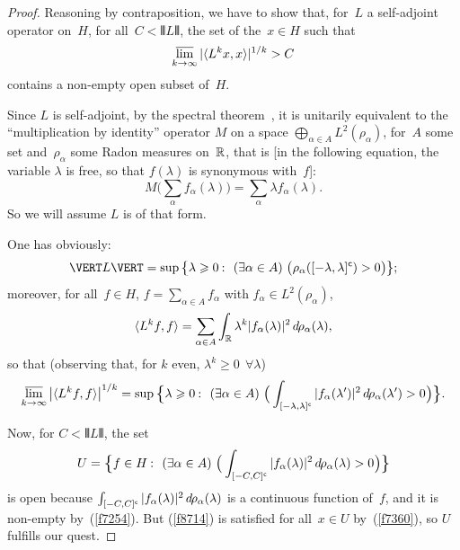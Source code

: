 \begin{proof}
Reasoning by contraposition, we have to show that,
for~$L$ a self-adjoint operator on~$H$, for all~$C < \VERT L \VERT$,
the set of the~$x \in H$ such that
\[ \label{f8714} \varlimsup_{k\to\infty} |\langle L^k x, x \rangle|^{1/k} > C \]
contains a non-empty open subset of~$H$.

Since $L$ is self-adjoint, by the spectral theorem~\cite[Theorem~7.18]{Weidmann},
it is unitarily equivalent to the ``multiplication by identity'' operator $M$
on a space $\bigoplus_{\alpha\in A} L^2(\rho_\alpha)$,
for~$A$ some set and~$\rho_\alpha$ some Radon measures on~$\mathbb{R}$, that is
[in the following equation, the variable $\lambda$ is free, so that
$f(\lambda)$ is synonymous with~$f$]:
\[ M\Big( \sum_\alpha f_\alpha(\lambda) \Big) = \sum_\alpha \lambda f_\alpha(\lambda) .\]
So we will assume $L$ is of that form.

One has obviously:
\[\label{f7254} \VERT L \VERT = \sup \big\{ \lambda \geq 0 \colon 
(\exists \alpha \in A) \ \big(\rho_\alpha(\C{[-\lambda,\lambda]}) > 0\big) \big\} ;\]
moreover, for all~$f \in H$,
$f = \sum_{\alpha\in A} f_\alpha$ with $f_\alpha \in L^2(\rho_\alpha)$,
\[ \langle L^k f, f \rangle =
\sum_{\alpha\in A} \int_{\RR} \lambda^k |f_\alpha(\lambda)|^2 \,\dx\rho_\alpha(\lambda) ,\]
so that (observing that, for $k$ even, $\lambda^k \geq 0\ \ \forall\lambda$)
\[\label{f7360}
\limsup_{k\longto\infty} \big|\langle L^k f, f \rangle\big|^{1/k}
= \sup \Big\{\lambda \geq 0 \colon (\exists \alpha \in A) \ 
\Big(\int_{\C{[-\lambda,\lambda]}} |f_\alpha(\lambda')|^2 \,\dx\rho_\alpha(\lambda') > 0\Big)\Big\}.\]

Now, for $C < \VERT L \VERT$, the set
\[ U = \Big\{ f \in H \colon (\exists \alpha \in A) \ 
\Big( \int_{\C{[-C,C]}} |f_\alpha(\lambda)|^2 \,\dx\rho_\alpha(\lambda) > 0 \Big) \Big\} \]
is open because $\int_{\C{[-C,C]}} |f_\alpha(\lambda)|^2 \,\dx\rho_\alpha(\lambda)$
is a continuous function of~$f$, and it is non-empty by~(\ref{f7254}).
But (\ref{f8714}) is satisfied for all~$x\in U$ by~(\ref{f7360}),
so $U$ fulfills our quest.
\end{proof}

